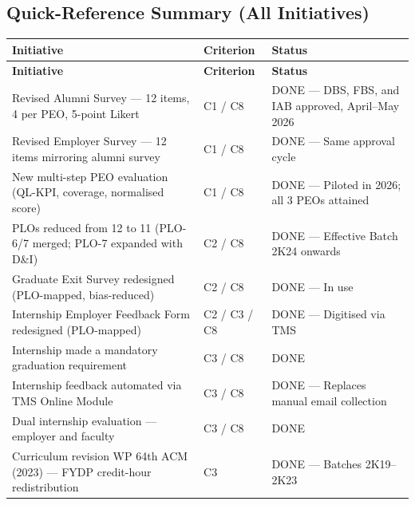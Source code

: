 \subsection{Quick-Reference Summary (All Initiatives)}
\label{subsec:quick-reference-summary}

\small
\renewcommand{\arraystretch}{1.2}

\begin{longtable}{|p{6.7cm}|p{1.8cm}|p{6.5cm}|}
\hline
\textbf{Initiative} & \textbf{Criterion} & \textbf{Status} \\
\hline
\endfirsthead

\hline
\textbf{Initiative} & \textbf{Criterion} & \textbf{Status} \\
\hline
\endhead

Revised Alumni Survey --- 12 items, 4 per PEO, 5-point Likert
& C1 / C8
& DONE --- DBS, FBS, and IAB approved, April--May 2026 \\
\hline

Revised Employer Survey --- 12 items mirroring alumni survey
& C1 / C8
& DONE --- Same approval cycle \\
\hline

New multi-step PEO evaluation (QL-KPI, coverage, normalised score)
& C1 / C8
& DONE --- Piloted in 2026; all 3 PEOs attained \\
\hline

PLOs reduced from 12 to 11 (PLO-6/7 merged; PLO-7 expanded with D\&I)
& C2 / C8
& DONE --- Effective Batch 2K24 onwards \\
\hline

Graduate Exit Survey redesigned (PLO-mapped, bias-reduced)
& C2 / C8
& DONE --- In use \\
\hline

Internship Employer Feedback Form redesigned (PLO-mapped)
& C2 / C3 / C8
& DONE --- Digitised via TMS \\
\hline

Internship made a mandatory graduation requirement
& C3 / C8
& DONE \\
\hline

Internship feedback automated via TMS Online Module
& C3 / C8
& DONE --- Replaces manual email collection \\
\hline

Dual internship evaluation --- employer and faculty
& C3 / C8
& DONE \\
\hline

Curriculum revision WP 64th ACM (2023) --- FYDP credit-hour redistribution
& C3
& DONE --- Batches 2K19--2K23 \\
\hline


\end{longtable}
